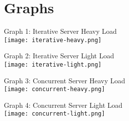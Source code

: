 \section*{Graphs}
\begin{center}
	Graph 1: Iterative Server Heavy Load\\
	\texttt{[image: iterative-heavy.png]}
	
	Graph 2: Iterative Server Light Load\\
	\texttt{[image: iterative-light.png]}
	
	\pagebreak
	
	Graph 3: Concurrent Server Heavy Load\\
	\texttt{[image: concurrent-heavy.png]}
	
	Graph 4: Concurrent Server Light Load\\
	\texttt{[image: concurrent-light.png]}
\end{center}
